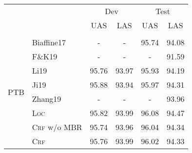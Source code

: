 \begin{table}[tb!]
  \centering
  \begin{tabular}{llcccc}
    \toprule
                             &                        & \multicolumn{2}{c}{Dev} & \multicolumn{2}{c}{Test}                                                                       \\
                             &                        & UAS                     & LAS                      & UAS                              & LAS                              \\[2pt]
    \hline
    \\[-15pt]
    \multirow{10}{*}{PTB}    & Biaffine17             & -                       & -                        & 95.74                            & 94.08                            \\
                             & F\&K19                 & -                       & -                        & -                                & 91.59                            \\
                             & Li19                   & 95.76                   & 93.97                    & 95.93                            & 94.19                            \\
                             & Ji19                   & 95.88                   & 93.94                    & 95.97                            & 94.31                            \\
                             & Zhang19                & -                       & -                        & -                                & 93.96                            \\[3pt]
                             & \textsc{Loc}           & 95.82                   & 93.99                    & 96.08                            & 94.47                            \\
                             & \textsc{Crf} w/o MBR   & 95.74                   & 93.96                    & 96.04                            & 94.34                            \\
                             & \textsc{Crf}           & 95.76                   & 93.99                    & 96.02                            & 94.33                            \\

\end{tabular}
\end{table}
